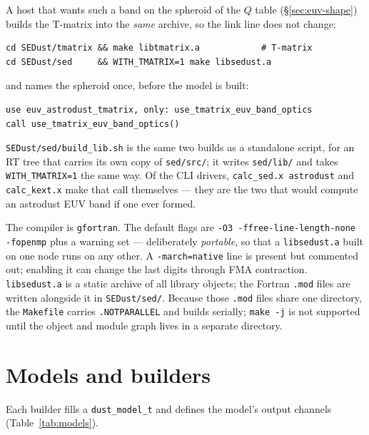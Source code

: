 \documentclass{my_memo}
\newcommand{\code}[1]{\texttt{#1}}
\begin{document}
A host that wants such a band on the spheroid of the $Q$ table
(\S\ref{sec:euv-shape}) builds the T-matrix into the \emph{same} archive, so the
link line does not change:
\begin{lstlisting}[style=sh]
cd SEDust/tmatrix && make libtmatrix.a            # T-matrix
cd SEDust/sed     && WITH_TMATRIX=1 make libsedust.a
\end{lstlisting}
and names the spheroid once, before the model is built:
\begin{lstlisting}
use euv_astrodust_tmatrix, only: use_tmatrix_euv_band_optics
call use_tmatrix_euv_band_optics()
\end{lstlisting}
\code{SEDust/sed/build\_lib.sh} is the same two builds as a standalone script,
for an RT tree that carries its own copy of \code{sed/src/}; it writes
\code{sed/lib/} and takes \code{WITH\_TMATRIX=1} the same way. Of the CLI
drivers, \code{calc\_sed.x astrodust} and \code{calc\_kext.x} make that call
themselves --- they are the two that would compute an astrodust EUV band if one
ever formed.

The compiler is \code{gfortran}. The default flags are
\code{-O3 -ffree-line-length-none -fopenmp} plus a warning set --- deliberately
\emph{portable}, so that a \code{libsedust.a} built on one node runs on any
other. A \code{-march=native} line is present but commented out; enabling it can
change the last digits through FMA contraction. \code{libsedust.a} is a static
archive of all library objects; the Fortran \code{.mod} files are written
alongside it in \code{SEDust/sed/}. Because those \code{.mod} files share one
directory, the \code{Makefile} carries \code{.NOTPARALLEL} and builds serially;
\code{make -j} is not supported until the object and module graph lives in a
separate directory.

\section{Models and builders}\label{sec:models}

Each builder fills a \code{dust\_model\_t} and defines the model's output
channels (Table~\ref{tab:models}).
\end{document}
